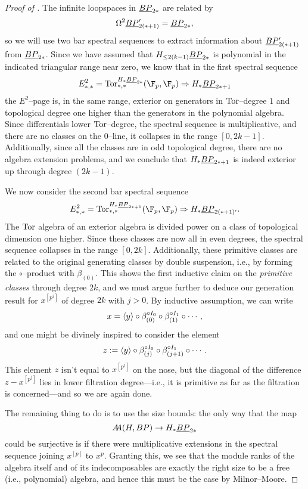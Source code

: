 \begin{proof}[{Proof of }]
The infinite loopspaces in \(\underline{\smash{BP}}_{2*}\) are related by \[\Omega^2 \underline{\smash{BP}}_{2(*+1)}' = \underline{\smash{BP}}_{2*},\] so we will use two bar spectral sequences to extract information about \(\underline{\smash{BP}}_{2(*+1)}'\) from \(\underline{\smash{BP}}_{2*}\).  Since we have assumed that \(H_{\le 2(k-1)} \underline{\smash{BP}}_{2*}\) is polynomial in the indicated triangular range near zero, we know that in the first spectral sequence \[E^2_{*, *} = \Tor^{H_* \OS{BP}{2*}}_{*, *}(\F_p, \F_p) \Rightarrow H_* \OS{BP}{2*+1}\] the \(E^2\)--page is, in the same range, exterior on generators in \(\operatorname{Tor}\)--degree \(1\) and topological degree one higher than the generators in the polynomial algebra.  Since differentials lower \(\operatorname{Tor}\)--degree, the spectral sequence is multiplicative, and there are no classes on the \(0\)--line, it collapses in the range \([0, 2k-1]\).  Additionally, since all the classes are in odd topological degree, there are no algebra extension problems, and we conclude that \(H_* \underline{\smash{BP}}_{2*+1}\) is indeed exterior up through degree \((2k-1)\).

We now consider the second bar spectral sequence \[E^2_{*, *} = \Tor^{H_* \OS{BP}{2*+1}}_{*, *}(\F_p, \F_p) \Rightarrow H_* \OS{BP}{2(*+1)'}.\]  The \(\operatorname{Tor}\) algebra of an exterior algebra is divided power on a class of topological dimension one higher.  Since these classes are now all in even degrees, the spectral sequence collapses in the range \([0, 2k]\).  Additionally, these primitive classes are related to the original generating classes by double suspension, i.e., by forming the \(\circ\)--product with \(\beta_{(0)}\).  This shows the first inductive claim on the \emph{primitive classes} through degree \(2k\), and we must argue further to deduce our generation result for \(x^{[p^j]}\) of degree \(2k\) with \(j > 0\).  By inductive assumption, we can write \[x = \langle y\rangle \circ \beta_{(0)}^{\circ I_0} \circ \beta_{(1)}^{\circ I_1} \circ \cdots,\] and one might be divinely inspired to consider the element \[z := \langle y\rangle \circ \beta_{(j)}^{\circ I_0} \circ \beta_{(j+1)}^{\circ I_1} \circ \cdots.\]  This element \(z\) isn't equal to \(x^{[p^j]}\) on the nose, but the diagonal of the difference \(z - x^{[p^j]}\) lies in lower filtration degree---i.e., it is primitive as far as the filtration is concerned---and so we are again done.

The remaining thing to do is to use the size bounds: the only way that the map \[A\!\!A(H, BP) \to H_* \underline{\smash{BP}}_{2*}\] could be surjective is if there were multiplicative extensions in the spectral sequence joining \(x^{[p]}\) to \(x^p\).  Granting this, we see that the module ranks of the algebra itself and of its indecomposables are exactly the right size to be a free (i.e., polynomial) algebra, and hence this must be the case by Milnor--Moore.
\end{proof}

